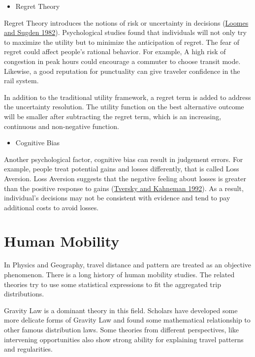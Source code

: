 \documentclass[
  11pt,
  openany]{memoir}
\providecommand{\tightlist}{%
  \setlength{\itemsep}{0pt}\setlength{\parskip}{0pt}}
\begin{document}
\begin{itemize}
\tightlist
\item
  Regret Theory
\end{itemize}

Regret Theory introduces the notions of risk or uncertainty in decisions (\protect\hyperlink{ref-loomesRegretTheoryAlternative1982}{Loomes and Sugden 1982}). Psychological studies found that individuals will not only try to maximize the utility but to minimize the anticipation of regret. The fear of regret could affect people's rational behavior. For example, A high risk of congestion in peak hours could encourage a commuter to choose transit mode. Likewise, a good reputation for punctuality can give traveler confidence in the rail system.

In addition to the traditional utility framework, a regret term is added to address the uncertainty resolution. The utility function on the best alternative outcome will be smaller after subtracting the regret term, which is an increasing, continuous and non-negative function.

\begin{itemize}
\tightlist
\item
  Cognitive Bias
\end{itemize}

Another psychological factor, cognitive bias can result in judgement errors. For example, people treat potential gains and losses differently, that is called Loss Aversion. Loss Aversion suggests that the negative feeling about losses is greater than the positive response to gains (\protect\hyperlink{ref-tverskyAdvancesProspectTheory1992}{Tversky and Kahneman 1992}). As a result, individual's decisions may not be consistent with evidence and tend to pay additional costs to avoid losses.

\hypertarget{human-mobility}{%
\section{Human Mobility}\label{human-mobility}}

In Physics and Geography, travel distance and pattern are treated as an objective phenomenon.
There is a long history of human mobility studies. The related theories try to use some statistical expressions to fit the aggregated trip distributions.

Gravity Law is a dominant theory in this field. Scholars have developed some more delicate forms of Gravity Law and found some mathematical relationship to other famous distribution laws. Some theories from different perspectives, like intervening opportunities also show strong ability for explaining travel patterns and regularities.
\end{document}
